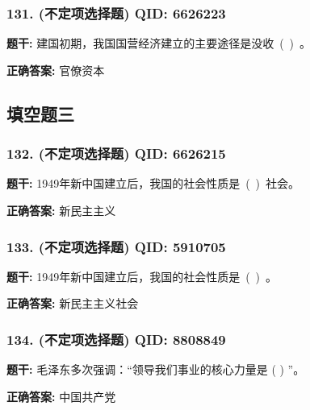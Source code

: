 \documentclass[12pt,UTF8]{ctexart}
\begin{document}
\vspace{0.3em}\hrulefill\vspace{0.7em}

\subsubsection*{131. (不定项选择题) \small QID: 6626223}

\textbf{题干:}
建国初期，我国国营经济建立的主要途径是没收 ( ) 。

\textbf{正确答案:}
官僚资本

\vspace{0.3em}\hrulefill\vspace{0.7em}

\subsection*{填空题三}

\subsubsection*{132. (不定项选择题) \small QID: 6626215}

\textbf{题干:}
1949年新中国建立后，我国的社会性质是 ( ) 社会。

\textbf{正确答案:}
新民主主义

\vspace{0.3em}\hrulefill\vspace{0.7em}

\subsubsection*{133. (不定项选择题) \small QID: 5910705}

\textbf{题干:}
1949年新中国建立后，我国的社会性质是 ( ) 。

\textbf{正确答案:}
新民主主义社会

\vspace{0.3em}\hrulefill\vspace{0.7em}

\subsubsection*{134. (不定项选择题) \small QID: 8808849}

\textbf{题干:}
毛泽东多次强调：“领导我们事业的核心力量是 ( ) ”。

\textbf{正确答案:}
中国共产党

\vspace{0.3em}\hrulefill\vspace{0.7em}
\end{document}
